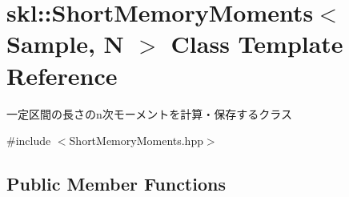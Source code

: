 \hypertarget{classskl_1_1_short_memory_moments}{}\section{skl\+:\+:Short\+Memory\+Moments$<$ Sample, N $>$ Class Template Reference}
\label{classskl_1_1_short_memory_moments}


一定区間の長さのn次モーメントを計算・保存するクラス  




{\ttfamily \#include $<$Short\+Memory\+Moments.\+hpp$>$}

\subsection*{Public Member Functions}

